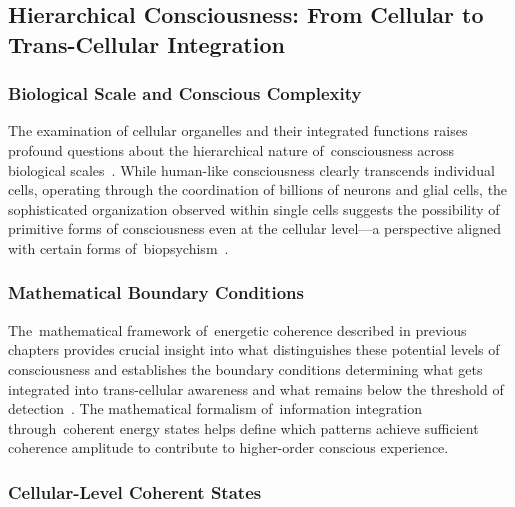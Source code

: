 \subsection*{Hierarchical Consciousness: From Cellular to Trans-Cellular Integration~~}

\subsubsection{Biological Scale and Conscious Complexity~~}

The examination of cellular organelles and their integrated functions raises profound questions about the hierarchical nature of~consciousness across biological scales~\cite{Baluska2016, Dehaene2014}. While human-like consciousness clearly transcends individual cells, operating through the coordination of billions of neurons and glial cells, the sophisticated organization observed within single cells suggests the possibility of primitive forms of consciousness even at the cellular level—a perspective aligned with certain forms of~biopsychism~\cite{Tononi2016, feinberg2016ancient}.

\subsubsection{Mathematical Boundary Conditions~~}

The~mathematical framework of~energetic coherence described in previous chapters provides crucial insight into what distinguishes these potential levels of consciousness and establishes the boundary conditions determining what gets integrated into trans-cellular awareness and what remains below the threshold of detection~\cite{Tononi2008, butlin2023consciousnessartificialintelligenceinsights}. The mathematical formalism of~information integration through~coherent energy states helps define which patterns achieve sufficient coherence amplitude to contribute to higher-order conscious experience.

\subsubsection{Cellular-Level Coherent States~~}

